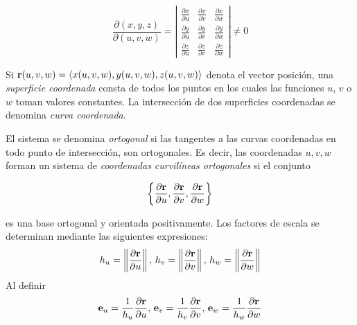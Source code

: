 \[\frac{\partial (x,y,z)}{\partial (u,v,w)}= \left|
\begin{array}{ccc}
\frac{\partial x}{\partial u} & \frac{\partial x}{\partial v} & \frac{\partial x}{\partial w}\\[0.1cm]
\frac{\partial y}{\partial u} & \frac{\partial y}{\partial v} & \frac{\partial y}{\partial w}\\[0.1cm]
\frac{\partial z}{\partial u} & \frac{\partial z}{\partial v} & \frac{\partial z}{\partial w}
\end{array} \right| \neq 0 \]

Si ${\bf r}(u,v,w)=\langle x(u,v,w),y(u,v,w),z(u,v,w)  \rangle$
denota el vector posición,
una \emph{superficie coordenada} consta de todos los puntos en los cuales las funciones  $u$, $v$ o $w$ toman valores constantes. La intersección de dos superficies coordenadas se denomina \emph{curva coordenada}.

El sistema se denomina \emph{ortogonal} si las tangentes a las curvas coordenadas en todo punto de intersección,
son ortogonales. Es decir, las coordenadas $u,v,w$ forman un sistema de \emph{coordenadas curvilíneas ortogonales} si el conjunto

\[\left \{\frac{\partial{\bf r}}{\partial u},\frac{\partial{\bf r}}{\partial v},\frac{\partial{\bf r}}{\partial w}\right \}\]

es una base ortogonal y orientada positivamente. Los factores de escala se determinan mediante las siguientes expresiones:
\[h_u= \left \Vert \frac{\partial{\bf r}}{\partial u}\right \Vert,\, h_v=\left\Vert\frac{\partial{\bf r}}{\partial v}\right\Vert,\,  h_w=\left\Vert\frac{\partial{\bf r}}{\partial w}\right\Vert\]
Al definir
\[\mathbf{e}_{u}= \frac{1}{h_u}\frac{\partial{\bf r}}{\partial u},\, \mathbf{e}_{v}=\frac{1}{h_v}\frac{\partial{\bf r}}{\partial v},\, \mathbf{e}_{w}=\frac{1}{h_w}\frac{\partial{\bf r}}{\partial w}\]

